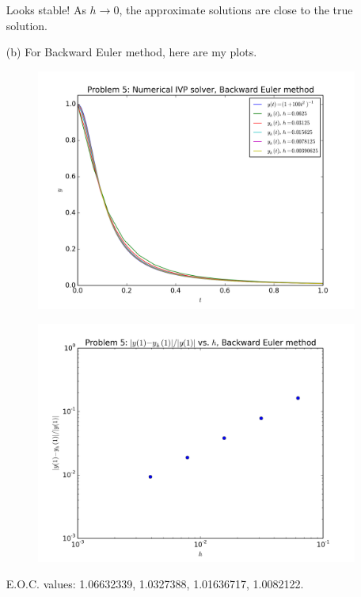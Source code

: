 \documentclass[10pt]{article}
\begin{document}
\begin{itemize}
Looks stable! As $h \to 0$, the approximate solutions are close to the true solution.

\newpage

\item[(b)] For Backward Euler method, here are my plots.

\begin{figure}[H]
  \centering
    \includegraphics[scale=0.6]{ivp_sol_b}
\end{figure}

\begin{figure}[H]
  \centering
    \includegraphics[scale=0.6]{ivp_err_b}
\end{figure}

E.O.C. values: 1.06632339,  1.0327388,   1.01636717,  1.0082122.


\end{itemize}
\end{document}

